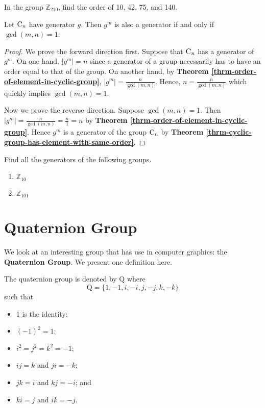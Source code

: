 \begin{exercise}
    In the group $\mathbb{Z}_{210}$, find the order of 10, 42, 75, and 140.
\end{exercise}

\begin{corollary-thrm}
    Let $\mathrm{C}_{n}$ have generator $g$. Then $g^m$ is also a generator if and only if $\gcd(m, n) = 1$.
\end{corollary-thrm}
\begin{proof}
    We prove the forward direction first. Suppose that $\mathrm{C}_{n}$ has a generator of $g^m$. On one hand, $|g^m| = n$ since a generator of a group necessarily has to have an order equal to that of the group. On another hand, by \textbf{Theorem \ref{thrm-order-of-element-in-cyclic-group}}, $|g^m| = \frac{n}{\gcd(m, n)}$. Hence, $n = \frac{n}{\gcd(m, n)}$ which quickly implies $\gcd(m, n) = 1$.

    Now we prove the reverse direction. Suppose $\gcd(m,n) = 1$. Then $|g^m| = \frac{n}{\gcd(m,n)} = \frac{n}{1} = n$ by \textbf{Theorem \ref{thrm-order-of-element-in-cyclic-group}}. Hence $g^m$ is a generator of the group $\mathrm{C}_{n}$ by \textbf{Theorem \ref{thrm-cyclic-group-has-element-with-same-order}}.
\end{proof}

\begin{exercise}
    Find all the generators of the following groups.
    \begin{enumerate}[label=(\alph*)]
        \item $\mathbb{Z}_{10}$
        \item $\mathbb{Z}_{101}$
    \end{enumerate}
\end{exercise}

\section{Quaternion Group}
We look at an interesting group that has use in computer graphics: the \textbf{Quaternion Group}. We present one definition here.
\begin{definition}
    The quaternion group is denoted by $\mathrm{Q}$ where
    \[
            \mathrm{Q} = \{1, -1, i, -i, j, -j, k, -k\}
    \]
    such that
    \begin{itemize}
        \item 1 is the identity;
        \item $(-1)^2 = 1$;
        \item $i^2 = j^2 = k^2 = -1$;
        \item $ij = k$ and $ji = -k$;
        \item $jk = i$ and $kj = -i$; and
        \item $ki = j$ and $ik = -j$.
    \end{itemize}
\end{definition}

